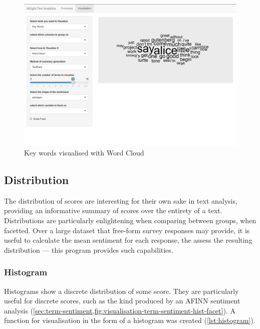 \documentclass[11pt, a4paper, twoside, titlepage]{report}
\begin{document}
\begin{figure}
\centering
\includegraphics[scale=0.35]{visualisation-keywords-wordcloud.png}
\caption{Key words visualised with Word Cloud\label{fig:visualisation-keywords-wordcloud}}
\end{figure}

\subsection{Distribution}\label{sec:distribution}

The distribution of scores are interesting for their own sake in text
analysis, providing an informative summary of scores over the
entirety of a text. Distributions are particularly enlightening when
comparing between groups, when facetted. Over a large dataset that
free-form survey responses may provide, it is useful to calculate the
mean sentiment for each response, the assess the resulting
distribution --- this program provides such capabilities.

\subsubsection{Histogram}\label{sec:histogram}

Histograms show a discrete distribution of some score. They are
particularly useful for discrete scores, such as the kind produced by
an AFINN sentiment analysis (\cref{sec:term-sentiment,fig:visualisation-term-sentiment-hist-facet}). A
function for visualisation in the form of a histogram was created
(\cref{lst:histogram}).
\end{document}
